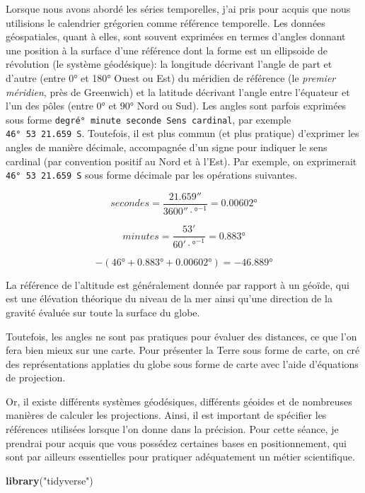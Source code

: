 \documentclass[]{book}
\newenvironment{Shaded}{\begin{snugshade}}{\end{snugshade}}
\newcommand{\KeywordTok}[1]{\textcolor[rgb]{0.13,0.29,0.53}{\textbf{#1}}}
\newcommand{\NormalTok}[1]{#1}
\newcommand{\StringTok}[1]{\textcolor[rgb]{0.31,0.60,0.02}{#1}}
\begin{document}
Lorsque nous avons abordé les séries temporelles, j'ai pris pour acquis
que nous utilisions le calendrier grégorien comme référence temporelle.
Les données géospatiales, quant à elles, sont souvent exprimées en
termes d'angles donnant une position à la surface d'une référence dont
la forme est un ellipsoide de révolution (le système géodésique): la
longitude décrivant l'angle de part et d'autre (entre 0° et 180° Ouest
ou Est) du méridien de référence (le \emph{premier méridien}, près de
Greenwich) et la latitude décrivant l'angle entre l'équateur et l'un des
pôles (entre 0° et 90° Nord ou Sud). Les angles sont parfois exprimées
sous forme
\texttt{degré°\ minute\textquotesingle{}\ seconde\textquotesingle{}\textquotesingle{}\ Sens\ cardinal},
par exemple
\texttt{46°\ 53\textquotesingle{}\ 21.659\textquotesingle{}\textquotesingle{}\ S}.
Toutefois, il est plus commun (et plus pratique) d'exprimer les angles
de manière décimale, accompagnée d'un signe pour indiquer le sens
cardinal (par convention positif au Nord et à l'Est). Par exemple, on
exprimerait
\texttt{46°\ 53\textquotesingle{}\ 21.659\textquotesingle{}\textquotesingle{}\ S}
sous forme décimale par les opérations suivantes.

\[
secondes = \frac{21.659''}{3600'' \cdot °^{-1}} = 0.00602°
\]

\[
minutes = \frac{53'}{60' \cdot °^{-1}} = 0.883°
\]

\[
- \left( 46° + 0.883° + 0.00602° \right) = -46.889°
\]

La référence de l'altitude est généralement donnée par rapport à un
géoïde, qui est une élévation théorique du niveau de la mer ainsi qu'une
direction de la gravité évaluée sur toute la surface du globe.

Toutefois, les angles ne sont pas pratiques pour évaluer des distances,
ce que l'on fera bien mieux sur une carte. Pour présenter la Terre sous
forme de carte, on cré des représentations applaties du globe sous forme
de carte avec l'aide d'équations de projection.

Or, il existe différents systèmes géodésiques, différents géoides et de
nombreuses manières de calculer les projections. Ainsi, il est important
de spécifier les références utilisées lorsque l'on donne dans la
précision. Pour cette séance, je prendrai pour acquis que vous possédez
certaines bases en positionnement, qui sont par ailleurs essentielles
pour pratiquer adéquatement un métier scientifique.

\begin{Shaded}
\begin{Highlighting}[]
\KeywordTok{library}\NormalTok{(}\StringTok{"tidyverse"}\NormalTok{)}
\end{Highlighting}
\end{Shaded}
\end{document}
